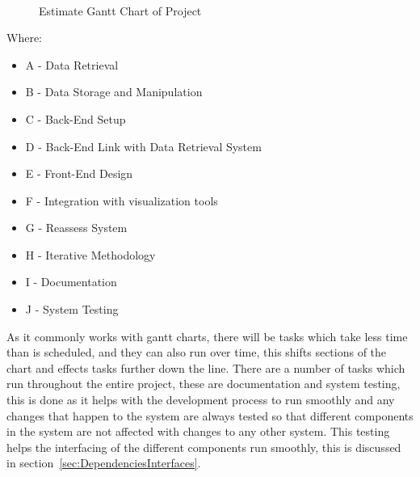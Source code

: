 \documentclass[12pt,onecolumn]{IEEEtran}
\begin{document}
\begin{center}
    \begin{figure}[htb]
        \centering
        \begin{ganttchart}{1}{30}
             \\
             \\
             \\
             \\
             \\
             \\
             \\
             \\
             \\
             \\    
             \\
        \end{ganttchart}
        \caption{Estimate Gantt Chart of Project}
        \label{fig:gantt}
    \end{figure}
\end{center}    
Where: 
\begin{itemize}
    \item A - Data Retrieval
    \item B - Data Storage and Manipulation
    \item C - Back-End Setup
    \item D - Back-End Link with Data Retrieval System
    \item E - Front-End Design
    \item F - Integration with visualization tools
    \item G - Reassess System
    \item H - Iterative Methodology
    \item I - Documentation
    \item J - System Testing
\end{itemize}

As it commonly works with gantt charts, there will be tasks which take less time than is scheduled, and they can also run over time, this shifts sections of the chart and effects tasks further down the line.
There are a number of tasks which run throughout the entire project, these are documentation and system testing, this is done as it helps with the development process to run smoothly and any changes that happen to the system are always tested so that different components in the system are not affected with changes to any other system. This testing helps the interfacing of the different components run smoothly, this is discussed in section~\ref{sec:DependenciesInterfaces}.
\end{document}
